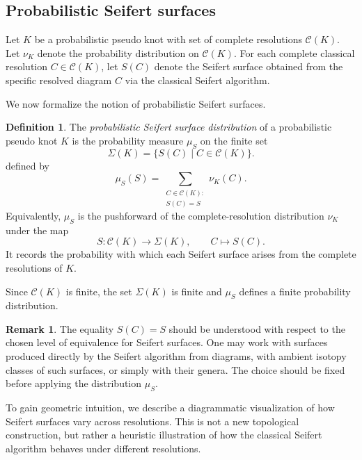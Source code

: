 \documentclass[a4paper, reqno, 12pt]{amsart}
\theoremstyle{plain}
\theoremstyle{definition}
\newtheorem{definition}[theorem]{Definition}
\newtheorem{remark}[theorem]{Remark}
\begin{document}



\subsection{Probabilistic Seifert surfaces}

Let \(K\) be a probabilistic pseudo knot with set of complete resolutions \(\mathcal C(K)\). Let \(\nu_K\) denote the probability distribution on \(\mathcal C(K)\). For each complete classical resolution \(C\in\mathcal C(K)\), let \(S(C)\) denote the Seifert surface obtained from the specific resolved diagram \(C\) via the classical Seifert algorithm.

We now formalize the notion of probabilistic Seifert surfaces.

\begin{definition}\rm
The \emph{probabilistic Seifert surface distribution} of a probabilistic pseudo knot \(K\) is the probability measure \(\mu_S\) on the finite set
\[
\Sigma(K)=\{S(C)\mid C\in\mathcal C(K)\}.
\]
defined by
\[
\mu_S(S)
=
\sum_{\substack{C\in\mathcal C(K):\\ S(C)=S}}
\nu_K(C).
\]
Equivalently, \(\mu_S\) is the pushforward of the complete-resolution distribution \(\nu_K\) under the map
\[
S:\mathcal C(K)\longrightarrow \Sigma(K),
\qquad
C\longmapsto S(C).
\]
It records the probability with which each Seifert surface arises from the complete resolutions of \(K\).
\end{definition}

Since \(\mathcal C(K)\) is finite, the set \(\Sigma(K)\) is finite and \(\mu_S\) defines a finite probability distribution.

\begin{remark}\rm
The equality \(S(C)=S\) should be understood with respect to the chosen level of equivalence for Seifert surfaces. One may work with surfaces produced directly by the Seifert algorithm from diagrams, with ambient isotopy classes of such surfaces, or simply with their genera. The choice should be fixed before applying the distribution \(\mu_S\).
\end{remark}

\smallbreak

To gain geometric intuition, we describe a diagrammatic visualization of how Seifert surfaces vary across resolutions. This is not a new topological construction, but rather a heuristic illustration of how the classical Seifert algorithm behaves under different resolutions.
\end{document}

